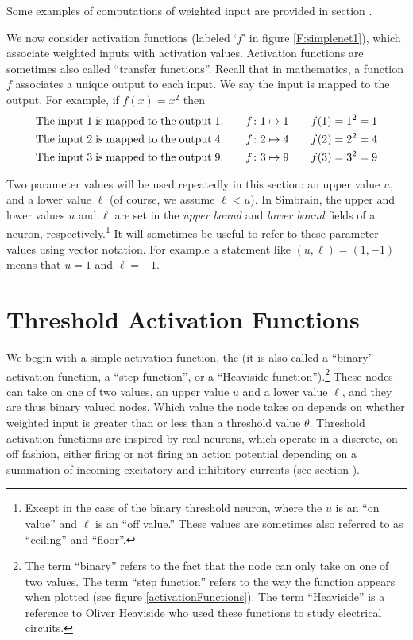 Some examples of computations of weighted input are provided in section .

We now consider activation functions (labeled `$f$' in figure
\ref{F:simplenet1}), which associate weighted inputs with activation 
values. Activation functions are sometimes also called ``transfer functions''. Recall 
that in mathematics, a function $f$ associates a unique output to each input. 
We say the input is mapped to the output. For example, if $f(x) = x^2$ 
then  
\begin{eqnarray*}
{\rm The\; input\; 1\; is\; mapped\; to\; the\; output\; 1}.
\qquad f\colon 1 \mapsto 1 
\qquad f(1)=1^2 = 1 \\ 
{\rm The\; input\; 2\; is\; mapped\; to\; the\; output\; 4}.
\qquad f\colon 2 \mapsto 4
\qquad f(2)=2^2 = 4 \\
{\rm The\; input\; 3\; is\; mapped\; to\; the\; output\; 9}.
\qquad f\colon 3 \mapsto 9
\qquad f(3)=3^2 = 9 
\end{eqnarray*}

   Two parameter values will be used repeatedly in this section: an upper value 
$u$, and a lower value $\ell$ (of course, we assume $\ell < u$). In Simbrain, the upper and lower values $u$ and 
$\ell$ are set in the \emph{upper bound} and \emph{lower bound} fields of a neuron, respectively.\footnote{Except in the case of the binary threshold neuron, where the $u$ is an ``on value'' and $\ell$ is an ``off value.''  These values are sometimes also referred to as ``ceiling'' and ``floor''.}  It will sometimes be useful to refer to these parameter values using vector notation. For example a statement like $(u,\ell) = (1,-1)$ means that $u = 1$ and $\ell = -1$. 

\section{Threshold Activation Functions}

   We begin with a simple activation function, the  (it is also called a ``binary'' activation function, a ``step function'', or a 
``Heaviside function'').\footnote{The term ``binary'' refers to the fact that the
node can only take on one of two values. The term ``step function'' refers to the way the function appears when plotted (see figure \ref{activationFunctions}). The term ``Heaviside'' is a reference to Oliver Heaviside  who used these functions to study electrical circuits.}  These nodes can take on one of two values, an upper 
value $u$ and a lower value $\ell$, and they are thus binary valued nodes. 
Which value the node takes on depends on whether weighted input is greater than 
or less than a threshold value $\theta$. Threshold 
activation functions are inspired by real neurons, which operate in a 
discrete, on-off fashion, either firing or not firing an action potential
depending on a summation of incoming excitatory and inhibitory currents (see section ).

